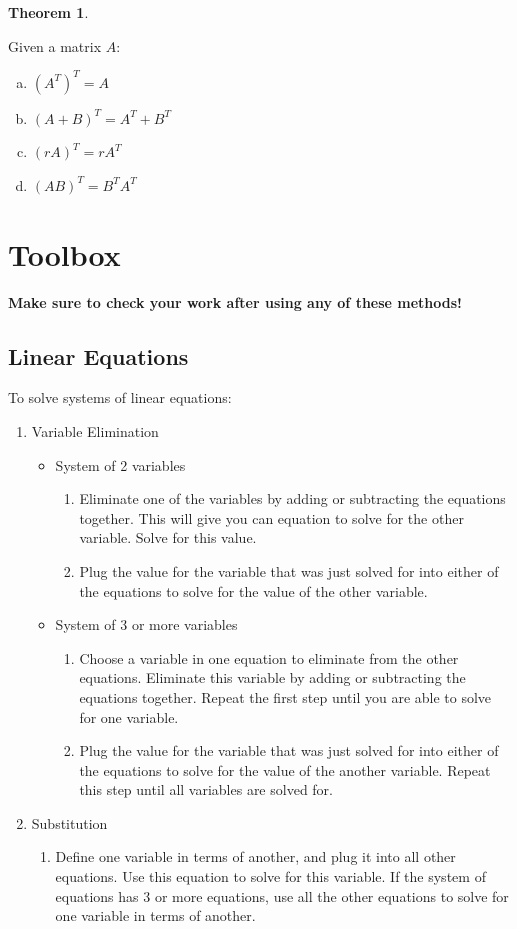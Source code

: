 \documentclass[a4paper,12pt]{article}
\theoremstyle{definition}
\newtheorem{theorem}{Theorem}
\theoremstyle{definition}
\begin{document}
	\begin{theorem}
		\label{thm:mat-transpose-props}
		
		Given a matrix $A$:
		\begin{enumerate}[a.]
			\item $(A^T)^T = A$
			\item $(A + B)^T = A^T + B^T$
			\item $(rA)^T = rA^T$
			\item $(AB)^T = B^TA^T$
		\end{enumerate}
	\end{theorem}
	\newpage
	
	\section{Toolbox}
	\textbf{Make sure to check your work after using any of these methods!}
	
	\subsection{Linear Equations}
	To solve systems of linear equations:
	\begin{enumerate}
		\item Variable Elimination
		\begin{itemize}
			\item System of 2 variables
			\begin{enumerate}
				\item Eliminate one of the variables by adding or subtracting the equations together. This will give you can equation to solve for the other variable. Solve for this value.
				\item Plug the value for the variable that was just solved for into either of the equations to solve for the value of the other variable.
			\end{enumerate}
			\item System of 3 or more variables
			\begin{enumerate}
				\item Choose a variable in one equation to eliminate from the other equations. Eliminate this variable by adding or subtracting the equations together. Repeat the first step until you are able to solve for one variable.
				\item Plug the value for the variable that was just solved for into either of the equations to solve for the value of the another variable. Repeat this step until all variables are solved for.
			\end{enumerate}
		\end{itemize}
		\item Substitution
		\begin{enumerate}
			\item Define one variable in terms of another, and plug it into all other equations. Use this equation to solve for this variable. If the system of equations has 3 or more equations, use all the other equations to solve for one variable in terms of another.
		\end{enumerate}
	\end{enumerate}
\end{document}
